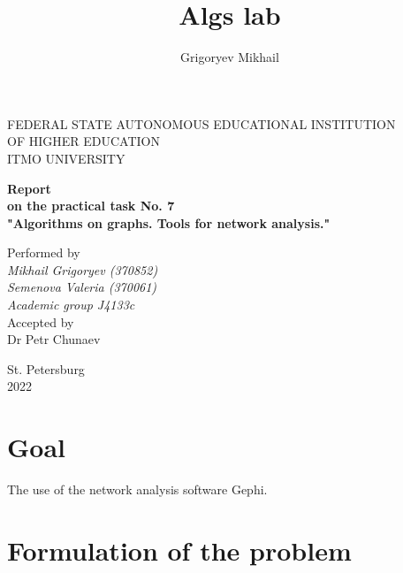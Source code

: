 \documentclass[12pt, a4paper]{article}
\author{Grigoryev Mikhail}
\title{Algs lab}
\begin{document}
\thispagestyle{empty}

\vspace{30mm}

\begin{center}
FEDERAL STATE AUTONOMOUS EDUCATIONAL INSTITUTION \\
OF HIGHER EDUCATION \\
ITMO UNIVERSITY

\vspace{40mm}

{\large \textbf{Report \\
on the practical task No. 7 \\
"Algorithms on graphs. Tools for network analysis."}}
\end{center}

\vspace{15mm}

\begin{flushright}
{\large Performed by \\
\textit{Mikhail Grigoryev (370852) \\
Semenova Valeria (370061) \\
Academic group J4133c \\}
Accepted by \\
Dr Petr Chunaev}
\end{flushright}

\vspace{80mm}

\begin{center}
St. Petersburg \\
2022
\end{center}

\newpage

\section*{Goal}

The use of the network analysis software Gephi.

\section*{Formulation of the problem}
\end{document}
